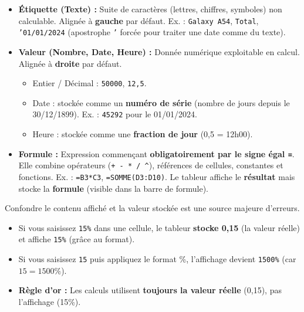 \documentclass[11pt]{article}
\begin{document}
\begin{propriete}
\begin{itemize}
    \item \textbf{Étiquette (Texte) :} Suite de caractères (lettres, chiffres, symboles) non calculable. Alignée à \textbf{gauche} par défaut. Ex. : \texttt{Galaxy A54}, \texttt{Total}, \texttt{'01/01/2024} (apostrophe \texttt{'} forcée pour traiter une date comme du texte).
    \item \textbf{Valeur (Nombre, Date, Heure) :} Donnée numérique exploitable en calcul. Alignée à \textbf{droite} par défaut.
        \begin{itemize}
            \item Entier / Décimal : \texttt{50000}, \texttt{12,5}.
            \item Date : stockée comme un \textbf{numéro de série} (nombre de jours depuis le 30/12/1899). Ex. : \texttt{45292} pour le 01/01/2024.
            \item Heure : stockée comme une \textbf{fraction de jour} (0,5 = 12h00).
        \end{itemize}
    \item \textbf{Formule :} Expression commençant \textbf{obligatoirement par le signe égal \texttt{=}}. Elle combine opérateurs (\texttt{+ - * / \^{}}), références de cellules, constantes et fonctions. Ex. : \texttt{=B3*C3}, \texttt{=SOMME(D3:D10)}. Le tableur affiche le \textbf{résultat} mais stocke la \textbf{formule} (visible dans la barre de formule).
\end{itemize}
\end{propriete}

\begin{attention}
Confondre le contenu affiché et la valeur stockée est une source majeure d'erreurs.
\begin{itemize}
    \item Si vous saisissez \texttt{15\%} dans une cellule, le tableur \textbf{stocke 0,15} (la valeur réelle) et affiche \texttt{15\%} (grâce au format).
    \item Si vous saisissez \texttt{15} puis appliquez le format \%, l'affichage devient \texttt{1500\%} (car $15 = 1500\%$).
    \item \textbf{Règle d'or :} Les calculs utilisent \textbf{toujours la valeur réelle} (0,15), pas l'affichage (15\%).
\end{itemize}
\end{attention}
\end{document}
